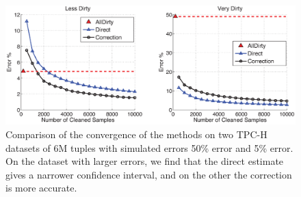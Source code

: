\begin{figure}
\includegraphics[width=.6\columnwidth]{figs/allerror-samplesize.eps}
\caption{Comparison of the convergence of the methods on two TPC-H datasets of 6M tuples with simulated errors 50\% error and 5\% error. On the dataset with larger errors, we find that the direct estimate gives a narrower confidence interval, and on the other the correction is more accurate.   \label{fig:est2}}
\end{figure}



